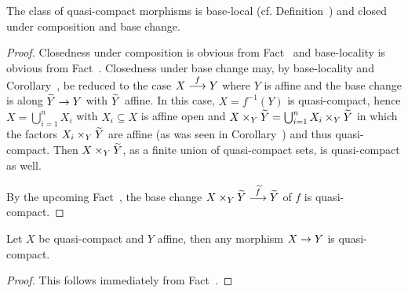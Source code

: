 \documentclass[a4paper,parskip=half,numbers=enddot, DIV=12]{scrreprt}
\begin{document}
\begin{fact}
    The class of quasi-compact morphisms is base-local (cf. Definition~) and closed under composition and base change. 
\end{fact}
\begin{proof}
    Closedness under composition is obvious from Fact~ and base-locality is obvious from Fact~. Closedness under base change may, by base-locality and Corollary~, be reduced to the case $X\morphism[f]Y$ where $Y$ is affine and the base change is along $\snake Y\morphism Y$ with $\snake Y$ affine. In this case, $X=f^{-1}(Y)$ is quasi-compact, hence $X=\bigcup_{i=1}^nX_i$ with $X_i\subseteq X$ is affine open and $X\times_Y\snake Y=\bigcup_{i=1}^n X_i\times_Y \snake Y$ in which the factors $X_i\times_Y \snake Y$ are affine (as was seen in Corollary~) and thus quasi-compact. Then $X\times_Y\snake Y$, as a finite union of quasi-compact sets, is quasi-compact as well. 
    
    By the upcoming Fact~, the base change $X\times_Y\snake Y\morphism[\snake f]\snake Y$ of $f$ is quasi-compact.  
\end{proof}
\begin{fact}
    Let $X$ be quasi-compact and $Y$ affine, then any morphism $X\morphism Y$ is quasi-compact.
\end{fact}
\begin{proof}
    This follows immediately from Fact~.
\end{proof}
\end{document}
